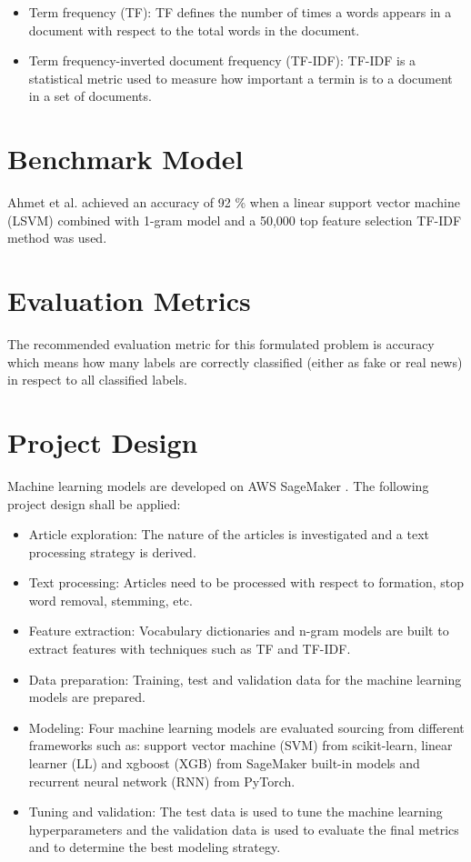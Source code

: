 \documentclass[a4paper,12pt,nottoc]{article}
\begin{document}
 \begin{itemize}
\item{Term frequency (TF): TF defines the number of times a words appears in a document with respect to the total words in the document.}
\item{Term frequency-inverted document frequency (TF-IDF): TF-IDF is a statistical metric used to measure how important a termin is to a document in a set of documents.}
\end{itemize}

\section*{Benchmark Model}

Ahmet et al. \cite{bib:ahmed-2017} achieved an accuracy of 92 \% when a linear support vector machine (LSVM) combined with 1-gram model and a 50,000 top feature selection TF-IDF method was used.

\section*{Evaluation Metrics}

The recommended evaluation metric for this formulated problem is accuracy which means how many labels are correctly classified (either as fake or real news) in respect to all classified labels.

\section*{Project Design}

Machine learning models are developed on AWS SageMaker \cite{bib:sagemaker}. The following project design shall be applied:

\begin{itemize}
\item{Article exploration: The nature of the articles is investigated and a text processing strategy is derived.}
\item{Text processing: Articles need to be processed with respect to formation, stop word removal, stemming, etc.}
\item{Feature extraction: Vocabulary dictionaries and n-gram models are built to extract features with techniques such as TF and TF-IDF.}
\item{Data preparation: Training, test and validation data for the machine learning models are prepared.}
\item{Modeling: Four machine learning models are evaluated sourcing from different frameworks such as: support vector machine (SVM) from scikit-learn, linear learner (LL) and xgboost (XGB) from SageMaker built-in models and recurrent neural network (RNN) from PyTorch.}
\item{Tuning and validation: The test data is used to tune the machine learning hyperparameters and the validation data is used to evaluate the final metrics and to determine the best modeling strategy.}
\end{itemize}
\end{document}
